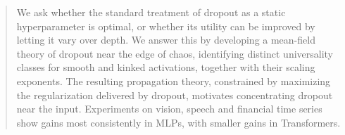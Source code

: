 \documentclass{article}
\newcommand{\PaperRoot}{.}
\theoremstyle{plain}
\theoremstyle{definition}
\theoremstyle{remark}
\begin{document}

\printAffiliationsAndNotice{}

\begin{abstract}
We ask whether the standard treatment of dropout as a static hyperparameter is optimal, or whether its utility can be improved by letting it vary over depth. We answer this by developing a mean-field theory of dropout near the edge of chaos, identifying distinct universality classes for smooth and kinked activations, together with their scaling exponents. The resulting propagation theory, constrained by maximizing the regularization delivered by dropout, motivates concentrating dropout near the input. Experiments on vision, speech and financial time series show gains most consistently in MLPs, with smaller gains in Transformers.
\end{abstract}














\newpage
\onecolumn

\appendix










\end{document}
